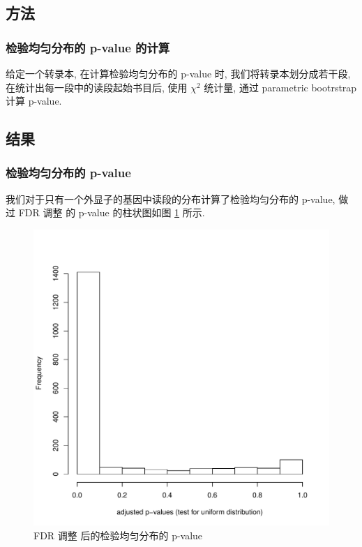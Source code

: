 \subsection{方法}
\subsubsection{检验均匀分布的 p-value 的计算}
给定一个转录本, 在计算检验均匀分布的 p-value 时, 
我们将转录本划分成若干段, 在统计出每一段中的读段起始书目后, 使用 $\chi^2$ 统计量, 
通过 parametric bootrstrap \cite{efron1993introduction} 计算 p-value. 

\subsection{结果}
\subsubsection{检验均匀分布的 p-value}
我们对于只有一个外显子的基因中读段的分布计算了检验均匀分布的 p-value, 
做过 FDR 调整 \cite{benjamini1995controlling} 的 p-value 
的柱状图如图 \ref{nonunif-adj-unif-pval} 所示. 

\begin{figure}[!t]
\centering
\includegraphics[width=\textwidth]{figures/nonunif/padj-hist.pdf}
\caption{FDR 调整 \cite{benjamini1995controlling} 后的检验均匀分布的 p-value}
\label{nonunif-adj-unif-pval}
\end{figure}

